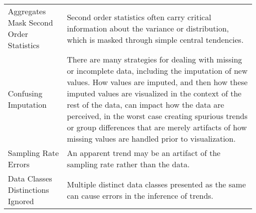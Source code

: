 \begin{longtable}{p{3cm}p{14cm}}
 \rowcolor{colorb}Aggregates Mask Second Order Statistics & Second order statistics often carry critical information about the variance or distribution, which is masked through simple central tendencies.  \cite{wall2017warning, few2019loom, matejka2017same, anscombe1973graphs}\\
 \rowcolor{colorb-opaque}Confusing Imputation & There are many strategies for dealing with missing or incomplete data, including the imputation of new values. How values are imputed, and then how these imputed values are visualized in the context of the rest of the data, can impact how the data are perceived, in the worst case creating spurious trends or group differences that are merely artifacts of how missing values are handled prior to visualization. \cite{song2018s}\\
 \rowcolor{colorb}Sampling Rate Errors  & An apparent trend may be an artifact of the sampling rate rather than the data. \cite{kindlmann2014algebraic}\\
 \rowcolor{colorb-opaque}Data Classes Distinctions Ignored & Multiple distinct data classes presented as the same can cause errors in the inference of trends. \cite{anand2015automatic}\\


\end{longtable}
